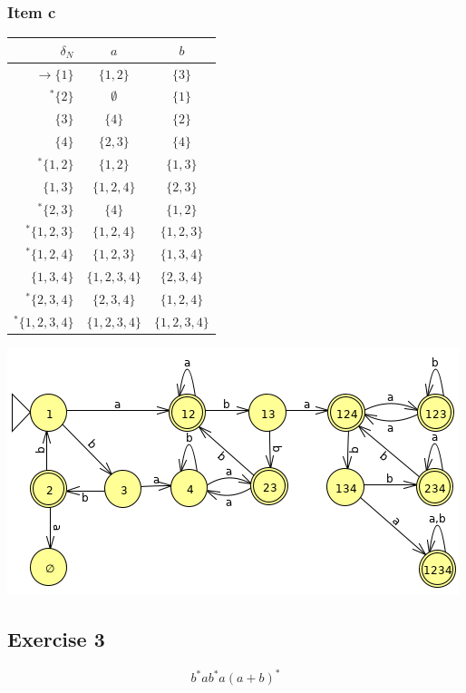 \documentclass[docid=TP06]{tcom_TP}
\begin{document}
{\subsubsection{Item c}
\begin{center} \begin{tabular}{r | c c}
	$\delta_N     $ & $a      $ & $b    $ \\ \hline
	$\rightarrow \{1    \}$ & $\{1,2  \}$ & $\{3    \}$\\
	$      ^* \{2    \}$ & $\emptyset$ & $\{1    \}$\\
	$            \{3    \}$ & $\{4    \}$ & $\{2    \}$\\
	$            \{4    \}$ & $\{2,3  \}$ & $\{4    \}$\\
	$      ^* \{1,2  \}$ & $\{1,2  \}$ & $\{1,3  \}$\\
	$            \{1,3  \}$ & $\{1,2,4\}$ & $\{2,3  \}$\\
	$      ^* \{2,3  \}$ & $\{4    \}$ & $\{1,2  \}$\\
	$      ^* \{1,2,3\}$ & $\{1,2,4\}$ & $\{1,2,3\}$\\
	$      ^* \{1,2,4\}$ & $\{1,2,3\}$ & $\{1,3,4\}$\\
	$            \{1,3,4\}$ & $\{1,2,3,4\}$ & $\{2,3,4\}$\\
	$      ^* \{2,3,4\}$ & $\{2,3,4\}$ & $\{1,2,4\}$\\
	$      ^* \{1,2,3,4\}$ & $\{1,2,3,4\}$ & $\{1,2,3,4\}$
\end{tabular} \end{center}
\begin{center} \includegraphics[scale=0.5]{TP06_2_d} \end{center}
\subsection{Exercise 3}
\begin{equation*}
	b^* a b^* a (a+b)^*
\end{equation*}
}
\end{document}
